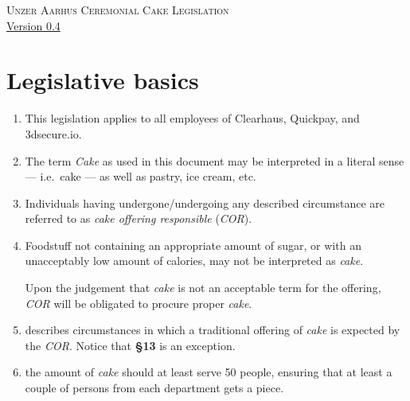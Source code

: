 \documentclass[a4paper, oneside, article]{memoir}
\newcounter{tbc}
\begin{document}
    \thispagestyle{empty} %
    \begin{center}
        \textsc{\huge Unzer Aarhus Ceremonial Cake Legislation}
        \\
        {\footnotesize \href{https://semver.org/}{Version 0.4}}
    \end{center}


    \chapter{Legislative basics}

    \begin{enumerate}[§ 1]
        \item This legislation applies to all employees of Clearhaus, Quickpay, and 3dsecure.io.


        \item The term \emph{Cake} as used in this document may be
        interpreted in a literal sense --- i.e.\ cake --- as well as pastry, ice
        cream, etc.

        \item Individuals having undergone/undergoing any described circumstance are
        referred to as \emph{cake offering responsible} (\emph{COR}).

        \item Foodstuff not containing an appropriate amount of sugar, or with an
        unacceptably low amount of calories, may not be interpreted as
        \emph{cake}.

        Upon the judgement that \emph{cake} is not an acceptable term for the
        offering, \emph{COR} will be obligated to procure proper \emph{cake}.

        \item {} describes circumstances in which a traditional
        offering of \emph{cake} is expected by the \emph{COR}. Notice that
        \textbf{§13} is an exception.

        \item the amount of \emph{cake} should at least serve 50 people, ensuring that at least a couple of persons from each department gets a piece.


        \setcounter{tbc}{\value{enumi}}
    \end{enumerate}
\end{document}
